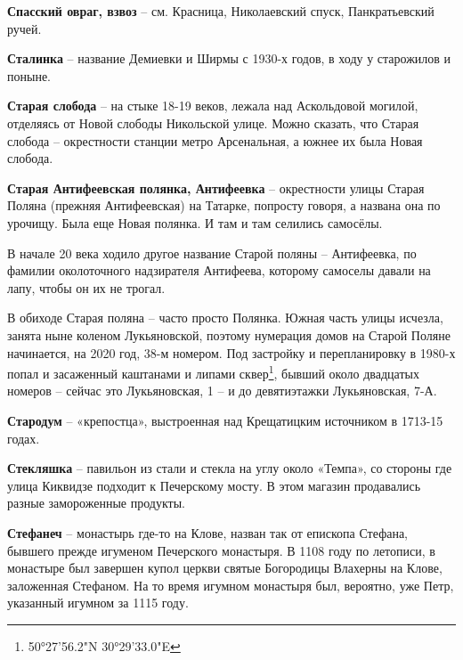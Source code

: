 \medskip

\textbf{Спасский овраг, взвоз} – см. Красница, Николаевский спуск, Панкратьевский ручей.\\

\medskip

\textbf{Сталинка} – название Демиевки и Ширмы с 1930-х годов, в ходу у старожилов и поныне.\\

\medskip


\textbf{Старая слобода} – на стыке 18-19 веков, лежала над Аскольдовой могилой, отделяясь от Новой слободы Никольской улице. Можно сказать, что Старая слобода – окрестности станции метро Арсенальная, а южнее их была Новая слобода.\\

\medskip

\textbf{Старая Антифеевская полянка, Антифеевка} – окрестности улицы Старая Поляна (прежняя Антифеевская) на Татарке, попросту говоря, а названа она по урочищу. Была еще Новая полянка. И там и там селились самосёлы. 

В начале 20 века ходило другое название Старой поляны – Антифеевка, по фамилии околоточного надзирателя Антифеева, которому самоселы давали на лапу, чтобы он их не трогал. 

В обиходе Старая поляна – часто просто Полянка. Южная часть улицы исчезла, занята ныне коленом Лукьяновской, поэтому нумерация домов на Старой Поляне начинается, на 2020 год, 38-м номером. Под застройку и перепланировку в 1980-х попал и засаженный каштанами и липами сквер\footnote{50°27'56.2"N 30°29'33.0"E}, бывший около двадцатых номеров – сейчас это Лукьяновская, 1 – и до девятиэтажки Лукьяновская, 7-А.\\

\medskip

\textbf{Стародум} – «крепостца», выстроенная  над Крещатицким источником в 1713-15 годах.\\

\medskip

\textbf{Стекляшка} – павильон из стали и стекла на углу около «Темпа», со стороны где улица Киквидзе подходит к Печерскому мосту. В этом магазин продавались разные замороженные продукты.\\

\medskip

\textbf{Стефанеч} – монастырь где-то на Клове, назван так от епископа Стефана, бывшего прежде игуменом Печерского монастыря. В 1108 году по летописи, в монастыре был завершен купол церкви святые Богородицы Влахерны на Клове, заложенная Стефаном. На то время игумном монастыря был, вероятно, уже Петр, указанный игумном за 1115 году.\\

